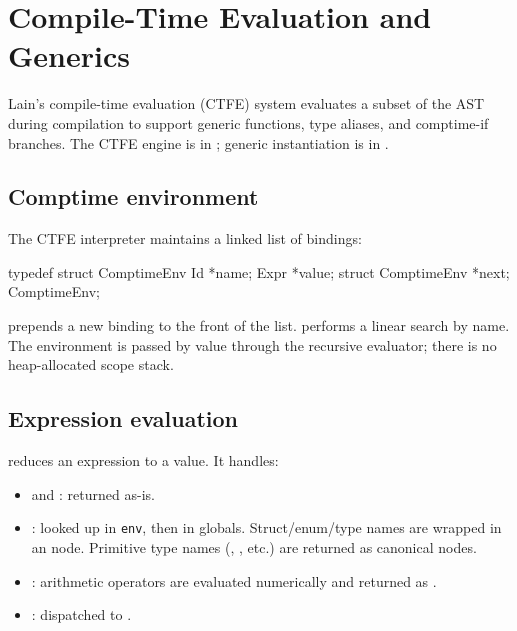 \chapter{Compile-Time Evaluation and Generics}
\label{chap:18-comptime}

\pnum
Lain's compile-time evaluation (CTFE) system evaluates a subset of the AST
during compilation to support generic functions, type aliases, and comptime-if
branches.  The CTFE engine is in ; generic
instantiation is in .

\section{Comptime environment}
\label{sec:ct-env}

\pnum
The CTFE interpreter maintains a linked list of bindings:

\begin{ccode}
typedef struct ComptimeEnv {
    Id       *name;
    Expr     *value;
    struct ComptimeEnv *next;
} ComptimeEnv;
\end{ccode}

\pnum
{} prepends a new binding to the front of the list.
 performs a linear search by name.  The environment
is passed by value through the recursive evaluator; there is no heap-allocated
scope stack.

\section{Expression evaluation}
\label{sec:ct-eval}

\pnum
{} reduces an expression to a
value.  It handles:

\begin{itemize}
\item {} and : returned as-is.
\item {}: looked up in \texttt{env}, then in globals.
  Struct/enum/type names are wrapped in an  node.
  Primitive type names (, , etc.) are returned as canonical
   nodes.
\item {}: arithmetic operators are evaluated numerically and
  returned as .
\item {}: dispatched to .
\end{itemize}


